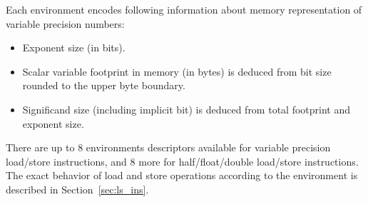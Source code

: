 Each environment encodes following information about memory representation of variable precision numbers:
\begin{itemize}[topsep=0pt]
\item Exponent size (in bits).
\item Scalar variable footprint in memory (in bytes) is deduced from bit size rounded to the upper byte boundary.
\item Significand size (including implicit bit) is deduced from total footprint and exponent size.
\end{itemize}
There are up to 8 environments descriptors available for variable precision load/store instructions, and 8 more for half/float/double load/store instructions.
The exact behavior of load and store operations according to the environment is described in Section~\ref{sec:ls_ins}.
